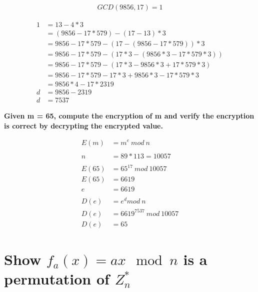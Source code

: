 \documentclass[letterpaper]{article}
\begin{document}
\begin{equation*}
  \begin{split}
GCD(9856, 17) = 1
  \end{split}
\end{equation*}

\begin{equation*}
  \begin{split}
1	&= 13 - 4*3 \\
&= (9856 - 17*579) - (17 - 13)*3 \\
&= 9856 - 17*579 - (17 - (9856 - 17*579))*3 \\
&= 9856 - 17*579 - (17*3 - (9856*3 - 17*579*3)) \\
&= 9856 - 17*579 - (17*3 - 9856*3 + 17*579*3) \\
&= 9856 - 17*579 - 17*3 + 9856*3 - 17*579*3 \\
&= 9856*4 - 17*2319 \\
d &= 9856 - 2319 \\
d &= 7537
  \end{split}
\end{equation*}

\textbf{Given m = 65, compute the encryption of m and verify the encryption is correct by decrypting the encrypted value.}

\begin{equation*}
  \begin{split}
E(m) &= m^e\ mod\ n \\
\\
n &= 89 * 113 = 10057 \\
\\
E(65) &= 65^17\ mod\ 10057 \\
E(65) &= 6619 \\
e &= 6619 \\
\\
D(e) &= e^d mod\ n \\
D(e) &= 6619^7537\ mod\ 10057 \\
D(e) &= 65
  \end{split}
\end{equation*}


\section{Show $f_a(x)=ax\mod n$ is a permutation of $Z_n^*$}
\end{document}
